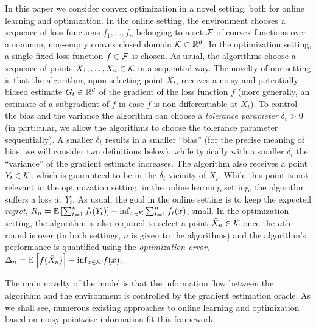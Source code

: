 In this paper we consider convex optimization in a novel setting, both for online learning and optimization. 
In the online setting, the environment chooses a sequence of loss functions $f_1,\dots,f_n$ belonging to a set $\mathcal{F}$ of convex functions over a common, non-empty convex closed domain $\mathcal{K}\subset \mathbb{R}^d$. 
In the optimization setting, a single fixed loss function $f\in \mathcal{F}$ is chosen.
As usual, the algorithms choose a sequence of points $X_1,\dots,X_n\in \mathcal{K}$ in a sequential way. 
The novelty of our setting is that the algorithm, upon selecting point $X_t$, receives 
a noisy and potentially biased estimate $G_t\in \mathbb{R}^d$ 
of the gradient of the loss function $f$ 
(more generally, an estimate of a subgradient of $f$ in case $f$ is non-differentiable at $X_t$). 
To control the bias and the variance the algorithm can choose a \emph{tolerance parameter} $\delta_t>0$ 
(in particular, we allow the algorithms to choose the tolerance parameter sequentially). 
A smaller $\delta_t$ results in a smaller ``bias'' (for the precise meaning of bias, we will consider two definitions below), while typically with a smaller $\delta_t$ the ``variance'' of the gradient estimate increases.
The algorithm also receives a point $Y_t\in \mathcal{K}$, which is guaranteed to be in the $\delta_t$-vicinity of $X_t$. 
While this point is not relevant in the optimization setting, in the online learning setting, 
the algorithm suffers a loss at $Y_t$.
As usual, the goal in the online setting is to keep the expected \emph{regret}, 
	$R_n =\mathbb{E}\left[ \sum_{t=1}^n f_t(Y_t)\right] - \inf_{x\in \mathcal{K}} \sum_{t=1}^n f_t(x)$,
small.
In the optimization setting, the algorithm is also required to select a point $\hat{X}_n\in \mathcal{K}$ once
the $n$th round is over (in both settings, $n$ is given to the algorithms)
and the algorithm's performance is quantified using the \emph{optimization error}, 
$\Delta_n = \mathbb{E}\left[f(\hat{X}_n)\right] - \inf_{x\in \mathcal{K}} f(x) $.

The main novelty of the model is that the information flow between the algorithm and the environment is controlled by the gradient estimation oracle. As we shall see, numerous existing approaches to online learning and optimization based on noisy pointwise information fit this framework. 


